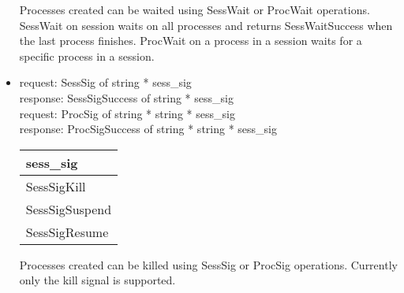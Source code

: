 \begin{itemize}
Processes created can be waited using SessWait or ProcWait operations.
SessWait on session waits on all processes and returns SessWaitSuccess
when the last process finishes.  ProcWait on a process in a session
waits for a specific process in a session.


\item request: SessSig of string * sess\_sig \\
   response: SessSigSuccess of string * sess\_sig \\
   request: ProcSig of string * string * sess\_sig \\
   response: ProcSigSuccess of string * string * sess\_sig \\

\begin{center}
\begin{tabular}{|l|}  \hline
sess\_sig \\ \hline
SessSigKill \\
SessSigSuspend \\
SessSigResume \\ \hline
\end{tabular}
\end{center}

Processes created can be killed using SessSig or ProcSig operations.
Currently only the kill signal is supported.
\end{itemize}
